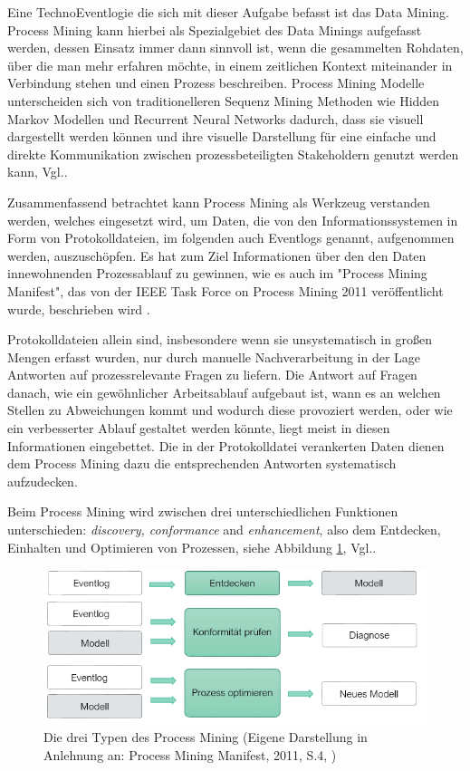 Eine TechnoEventlogie die sich mit dieser Aufgabe befasst ist das Data Mining. Process Mining kann hierbei als Spezialgebiet des Data Minings aufgefasst werden, dessen Einsatz immer dann sinnvoll ist, wenn die gesammelten Rohdaten, über die man mehr erfahren möchte, in einem zeitlichen Kontext miteinander in Verbindung stehen und einen Prozess beschreiben.
Process Mining Modelle unterscheiden sich von traditionelleren Sequenz Mining Methoden wie Hidden Markov Modellen\cite{hmm} und Recurrent Neural Networks\cite{rnn} dadurch, dass sie visuell dargestellt werden können und ihre visuelle Darstellung für eine einfache und direkte Kommunikation zwischen prozessbeteiligten Stakeholdern genutzt werden kann, Vgl.\cite{localMining}.

Zusammenfassend betrachtet kann Process Mining als Werkzeug verstanden werden, welches eingesetzt wird, um Daten, die von den Informationssystemen in Form von Protokolldateien, im folgenden auch Eventlogs genannt, aufgenommen werden, auszuschöpfen. Es hat zum Ziel  Informationen über den den Daten innewohnenden Prozessablauf zu gewinnen, wie es auch im "Process Mining Manifest", das von der IEEE Task Force on Process Mining 2011 veröffentlicht wurde, beschrieben wird \cite{PMManifesto}. 

Protokolldateien allein sind, insbesondere wenn sie unsystematisch in großen Mengen erfasst wurden, nur durch manuelle Nachverarbeitung in der Lage Antworten auf prozessrelevante Fragen zu liefern. Die Antwort auf Fragen danach, wie ein gewöhnlicher Arbeitsablauf aufgebaut ist, wann es an welchen Stellen zu Abweichungen kommt und wodurch diese provoziert werden, oder wie ein verbesserter Ablauf gestaltet werden könnte, liegt meist in diesen Informationen eingebettet. Die in der Protokolldatei verankerten Daten dienen dem Process Mining dazu die entsprechenden Antworten systematisch aufzudecken. 

Beim Process Mining wird zwischen drei unterschiedlichen Funktionen unterschieden:  \textit{discovery, conformance} and \textit{enhancement}, also dem Entdecken, Einhalten und Optimieren von Prozessen, siehe Abbildung \ref{fig:pm_functions}, Vgl.\cite{PMManifesto}.
\vspace{10mm}

\begin{figure}[!ht]
    \centering
    \includegraphics[scale=0.8]{figures/Appbildungen/PM_functions.PNG}
    \caption{Die drei Typen des Process Mining (Eigene Darstellung in Anlehnung an: Process Mining Manifest, 2011, S.4, \cite{PMManifesto})}
    \label{fig:pm_functions}
\end{figure}

